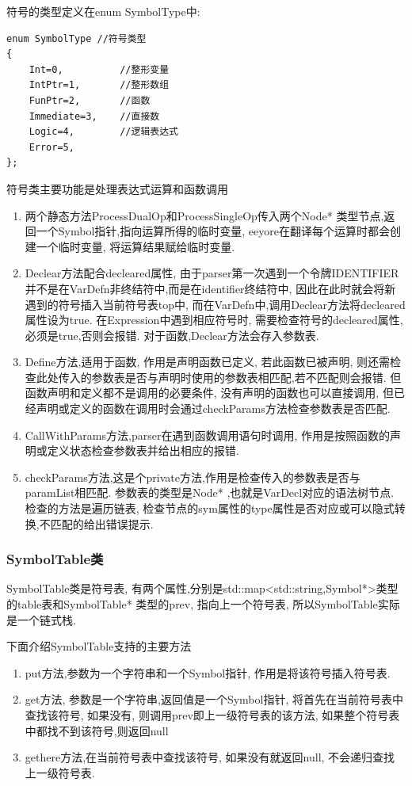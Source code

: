 \documentclass[UTF8]{article}
\begin{document}
符号的类型定义在enum SymbolType中:
\begin{lstlisting}
enum SymbolType //符号类型
{
    Int=0,          //整形变量
    IntPtr=1,       //整形数组
    FunPtr=2,       //函数
    Immediate=3,    //直接数
    Logic=4,        //逻辑表达式
    Error=5,        
};
\end{lstlisting}
符号类主要功能是处理表达式运算和函数调用
\begin{enumerate}[(1)]
\item 两个静态方法ProcessDualOp和ProcessSingleOp传入两个Node* 类型节点,返回一个Symbol指针,指向运算所得的临时变量, eeyore在翻译每个运算时都会创建一个临时变量, 将运算结果赋给临时变量.
\item Declear方法配合decleared属性, 由于parser第一次遇到一个令牌IDENTIFIER并不是在VarDefn非终结符中,而是在identifier终结符中, 因此在此时就会将新遇到的符号插入当前符号表top中, 而在VarDefn中,调用Declear方法将decleared属性设为true. 在Expression中遇到相应符号时, 需要检查符号的decleared属性,必须是true,否则会报错. 对于函数,Declear方法会存入参数表.
\item Define方法,适用于函数, 作用是声明函数已定义, 若此函数已被声明, 则还需检查此处传入的参数表是否与声明时使用的参数表相匹配,若不匹配则会报错. 但函数声明和定义都不是调用的必要条件, 没有声明的函数也可以直接调用, 但已经声明或定义的函数在调用时会通过checkParams方法检查参数表是否匹配.
\item CallWithParams方法,parser在遇到函数调用语句时调用, 作用是按照函数的声明或定义状态检查参数表并给出相应的报错.
\item checkParams方法,这是个private方法,作用是检查传入的参数表是否与paramList相匹配. 参数表的类型是Node* ,也就是VarDecl对应的语法树节点. 检查的方法是遍历链表, 检查节点的sym属性的type属性是否对应或可以隐式转换,不匹配的给出错误提示.
\end{enumerate}

\subsubsection{SymbolTable类}
SymbolTable类是符号表, 有两个属性,分别是std::map<std::string,Symbol*>类型的table表和SymbolTable* 类型的prev, 指向上一个符号表, 所以SymbolTable实际是一个链式栈.

下面介绍SymbolTable支持的主要方法
\begin{enumerate}[(1)]
\item put方法,参数为一个字符串和一个Symbol指针, 作用是将该符号插入符号表.
\item get方法, 参数是一个字符串,返回值是一个Symbol指针, 将首先在当前符号表中查找该符号, 如果没有, 则调用prev即上一级符号表的该方法, 如果整个符号表中都找不到该符号,则返回null
\item gethere方法,在当前符号表中查找该符号, 如果没有就返回null, 不会递归查找上一级符号表.
\end{enumerate}
\end{document}
